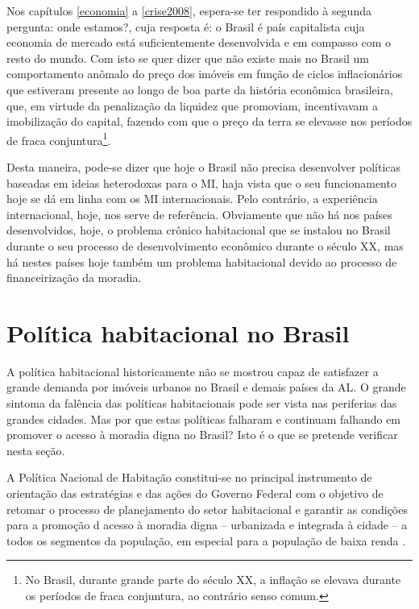 \documentclass[
	12pt,				%
	oneside,			%
	a4paper,			%
	chapter=TITLE,		%
	section=TITLE,		%
	english,			%
	brazil				%
	]{abntex2}
\begin{document}
\begin{refsection}
Nos capítulos \ref{economia} a \ref{crise2008}, espera-se ter respondido à
segunda pergunta: onde estamos?, cuja resposta é: o Brasil é país capitalista
cuja economia de mercado está suficientemente desenvolvida e em compasso com o
resto do mundo. Com isto se quer dizer que não existe mais no Brasil um
comportamento anômalo do preço dos imóveis em função de ciclos inflacionários
que estiveram presente ao longo de boa parte da história econômica brasileira,
que, em virtude da penalização da liquidez que promoviam, incentivavam a
imobilização do capital, fazendo com que o preço da terra se elevasse nos
períodos de fraca conjuntura\footnote{No Brasil, durante grande parte do século XX, a inflação se elevava
  durante os períodos de fraca conjuntura, ao contrário senso comum.}.

Desta maneira, pode-se dizer que hoje o Brasil não precisa desenvolver políticas
baseadas em ideias heterodoxas para o \gls{MI}, haja vista que o seu
funcionamento hoje se dá em linha com os \gls{MI} internacionais. Pelo contrário,
a experiência internacional, hoje, nos serve de referência. Obviamente que não
há nos países desenvolvidos, hoje, o problema crônico habitacional que se
instalou no Brasil durante o seu processo de desenvolvimento econômico durante o
século XX, mas há nestes países hoje também um problema habitacional devido ao
processo de financeirização da moradia.

\hypertarget{poluxedtica-habitacional-no-brasil}{%
\section{Política habitacional no Brasil}\label{poluxedtica-habitacional-no-brasil}}

A política habitacional historicamente não se mostrou capaz de satisfazer a
grande demanda por imóveis urbanos no Brasil e demais países da \gls{AL}. O
grande sintoma da falência das políticas habitacionais pode ser vista nas
periferias das grandes cidades. Mas por que estas políticas falharam e continuam
falhando em promover o acesso à moradia digna no Brasil? Isto é o que se
pretende verificar nesta seção.

A Política Nacional de Habitação constitui-se no principal instrumento de
orientação das estratégias e das ações do Governo Federal com o objetivo de
retomar o processo de planejamento do setor habitacional e garantir as condições
para a promoção d acesso à moradia digna -- urbanizada e integrada à cidade -- a
todos os segmentos da população, em especial para a população de baixa renda
\autocite{planhab}.


\end{refsection}
\end{document}

